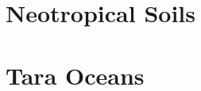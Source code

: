 
\section{Neotropical Soils}
\label{supp:sec:DetailsEmpiricalDatasets:sub:NTS}



\section{Tara Oceans}
\label{supp:sec:DetailsEmpiricalDatasets:sub:Tara}

